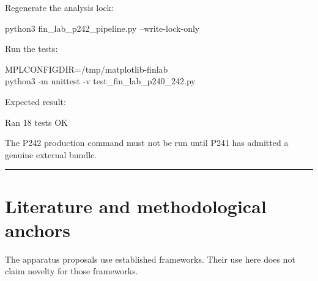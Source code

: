 \documentclass[11pt,a4paper,openany]{report}
\begin{document}
Regenerate the analysis lock:

python3 fin\_lab\_p242\_pipeline.py --write-lock-only

Run the tests:

MPLCONFIGDIR=/\allowbreak{}tmp/\allowbreak{}matplotlib-finlab \\
python3 -m unittest -v test\_fin\_lab\_p240\_242.py

Expected result:

Ran 18 tests OK

The P242 production command must not be run until P241 has admitted a genuine external bundle.

\par\medskip\hrule\medskip

\chapter{Literature and methodological anchors}

The apparatus proposals use established frameworks. Their use here does not claim novelty for those frameworks.
\end{document}
